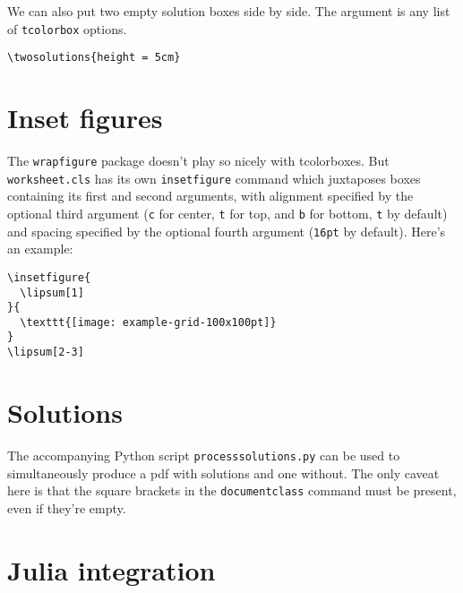\documentclass[julia,solutions]{worksheet}
\begin{document}
We can also put two empty solution boxes side by side. The argument is any list of \texttt{tcolorbox} options. 
\begin{verbatim}
\twosolutions{height = 5cm}
\end{verbatim}
  \begin{tcbraster}[
      raster columns=2,
      height = 5cm 
    ]
    \begin{solution}
    \end{solution}
    \begin{solution}
    \end{solution}
  \end{tcbraster}

  \vspace{12pt}

\section{Inset figures} 

The \texttt{wrapfigure} package doesn't play so nicely with tcolorboxes. But \texttt{worksheet.cls} has its own \texttt{insetfigure} command which juxtaposes boxes containing its first and second arguments, with alignment specified by the optional third argument (\texttt{c} for center, \texttt{t} for top, and \texttt{b} for bottom, \texttt{t} by default) and spacing specified by the optional fourth argument (\texttt{16pt} by default). Here's an example:

\begin{verbatim}
\insetfigure{
  \lipsum[1]
}{
  \texttt{[image: example-grid-100x100pt]}
}
\lipsum[2-3]
\end{verbatim}
\lipsum[2-3]

\section{Solutions}

The accompanying Python script \texttt{processsolutions.py} can be used to simultaneously produce a pdf with solutions and one without. The only caveat here is that the square brackets in the \texttt{documentclass} command must be present, even if they're empty. 

\section{Julia integration}
\end{document}
